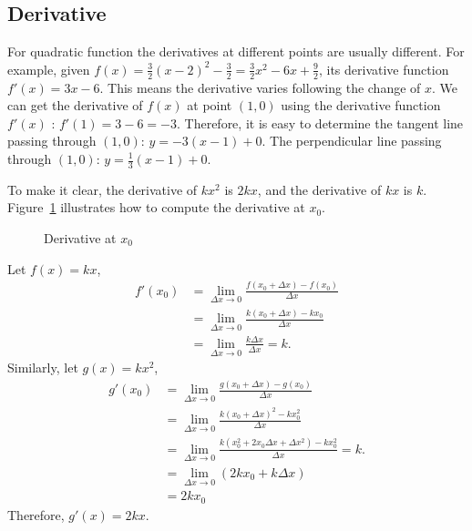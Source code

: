 \documentclass[11pt, oneside]{article}   	%
\begin{document}
\subsection{Derivative}
For quadratic function the derivatives at different points are usually different. For example, given $f(x)=\frac{3}{2}(x-2)^2-\frac{3}{2}=\frac{3}{2}x^2-6x+\frac{9}{2}$, its derivative function $f'(x)=3x-6$. This means the derivative varies following the change of $x$. We can get the derivative of $f(x)$ at point $(1,0)$ using the derivative function $f'(x)$ : $f'(1)=3-6=-3$. Therefore, it is easy to determine the tangent line passing through $(1,0)$: $y=-3(x-1)+0$. The perpendicular line passing through $(1,0)$: $y=\frac{1}{3}(x-1)+0$. 

To make it clear, the derivative of $kx^2$ is $2kx$, and the derivative of $kx$ is $k$.  Figure~\ref{fig:derivative} illustrates how to compute the derivative at $x_0$.
\begin{figure}
\centering
{}
\caption{Derivative at $x_0$}
\label{fig:derivative}
\end{figure}


Let $f(x)=kx$, 
\begin{align*}
f'(x_0) &=\lim_{\Delta x \rightarrow 0} \frac{f(x_0+\Delta x) - f(x_0)}{\Delta x}\\
&=\lim_{\Delta x \rightarrow 0} \frac{k(x_0+\Delta x) - kx_0}{\Delta x}\\
&=\lim_{\Delta x \rightarrow 0} \frac{k \Delta x}{\Delta x}=k.
\end{align*}
Similarly, let $g(x) = kx^2$,
\begin{align*}
g'(x_0) &=\lim_{\Delta x \rightarrow 0} \frac{g(x_0+\Delta x) - g(x_0)}{\Delta x}\\
&=\lim_{\Delta x \rightarrow 0} \frac{k(x_0+\Delta x)^2 - kx_0^2}{\Delta x}\\
&=\lim_{\Delta x \rightarrow 0} \frac{k(x_0^2+2x_0 \Delta x + \Delta x^2)-kx_0^2}{\Delta x}=k.\\
&=\lim_{\Delta x \rightarrow 0} (2k x_0+k \Delta x)\\
&=2kx_0
\end{align*}
Therefore, $g'(x)=2kx$.
\end{document}
